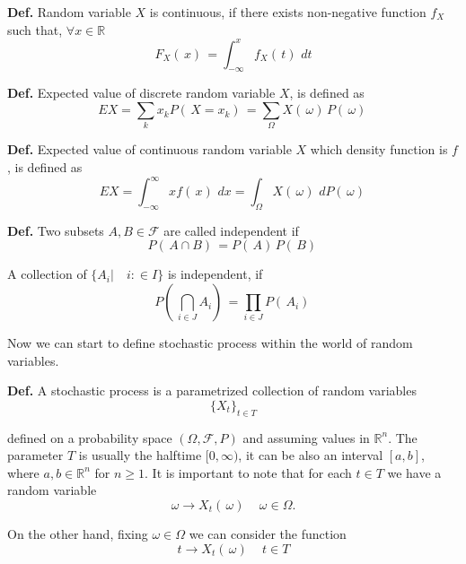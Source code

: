 \documentclass[thesis=M,english]{FITthesis}[2019/12/23]
\begin{document}
\textbf{Def.} Random variable $X$ is continuous, if there exists non-negative function $f_X$ such that, $\forall x \in \mathbb{R}$
\begin{equation*}
    F_X( \,x) \, = \int_{-\infty}^{x} f_X( \,t) \, \,dt
\end{equation*}


\textbf{Def.} Expected value of discrete random variable $X$, is defined as
\begin{equation*}
    E X = \sum_{k} x_k P( \, X=x_k ) \, = \sum_{\Omega} X( \,\omega) \,P( \,\omega) \,
\end{equation*}

\textbf{Def.} Expected value of continuous random variable $X$ which density function is $f$, is defined as
\begin{equation*}
    E X = \int_{-\infty}^{\infty} x f( \, x) \, \,dx = \int_{\Omega} X( \, \omega) \, \,d P( \, \omega) \, 
\end{equation*}

\textbf{Def.} Two subsets $A, B \in \mathcal{F}$ are called independent if  
\begin{equation*}
    P( \, A\cap B ) \,  = P( \,A ) \, P( \,B ) \, 
\end{equation*}

A collection of $\{A_i | \quad i: \in I\}$ is independent, if
\begin{equation*}
    P( \, \bigcap_{i \in J}A_i) \,  = \prod_{i \in J} P( \,A_i ) \,
\end{equation*}

Now we can start to define stochastic process within the world of random variables.

\noindent\textbf{Def.} A stochastic process is a parametrized collection of random variables
\begin{equation*}
    \{X_t\}_{t \in T}
\end{equation*}

defined on a probability space $(\Omega, \mathcal{F}, P)$ and assuming values in $\mathbb{R}^n$.
The parameter $T$ is usually the halftime $[0,\infty)$, it can be also an interval $[a,b]$, where $a,b \in \mathbb{R}^n$ for $n \geq 1$. It is important to note that for each $t \in T$ we have a random variable
\begin{equation*}
    \omega \rightarrow X_t(\,\omega )\, \quad       \omega \in \Omega.
\end{equation*}

On the other hand, fixing $\omega \in \Omega$ we can consider the function
\begin{equation*}
    t \rightarrow X_t(\, \omega )\, \quad       t \in T
\end{equation*}
\end{document}
